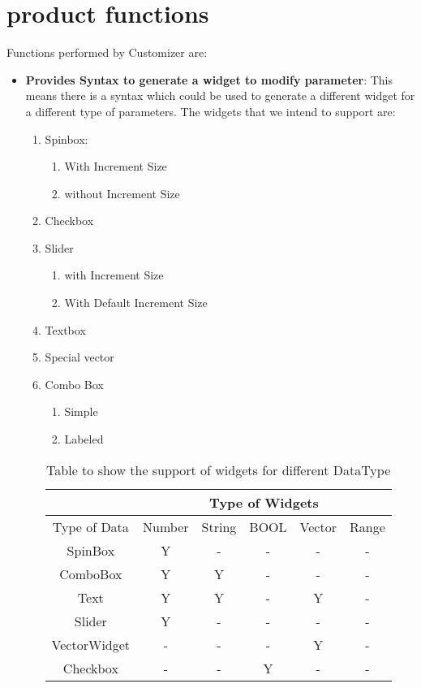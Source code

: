 \section{product functions}

Functions performed by Customizer are:
\begin{itemize}
    \item {\bf Provides Syntax to generate a widget to modify parameter}: This means there is a syntax which could be used to generate a different widget for a different type of parameters.
    The widgets that we intend to support are:
    \begin{enumerate}
        \item Spinbox:
        \begin{enumerate}
            \item With Increment Size
            \item without Increment Size
        \end{enumerate}
        \item Checkbox
        \item Slider
        \begin{enumerate}
            \item with Increment Size
            \item With Default Increment Size
        \end{enumerate}
        \item Textbox
        \item Special vector
        \item Combo Box
        \begin{enumerate}
            \item Simple
            \item Labeled
        \end{enumerate}
       
        \begin{table}[h]
            \centering
            \begin{tabular}{ |c|c|c|c|c|c| }
                \hline
                & \multicolumn{5}{|c|}{Type of Widgets} \\
                \hline
                Type of Data&    Number&    String&    BOOL &Vector &Range     \\ [0.5ex]
                \hline
                SpinBox&Y&    -&    -&    -&    - \\ \hline
                ComboBox&    Y&    Y&    -&    -&    - \\ \hline
                Text&    Y&    Y&    -&    Y&    - \\ \hline
                Slider&    Y&    -&    -&    -&    - \\ \hline
                VectorWidget&    -&    -&    -&    Y&- \\ \hline
                Checkbox&    -&    -&    Y&    -&    - \\ [1ex]
                \hline
            \end{tabular}
            \caption{Table to show the support of widgets for different DataType}
            \label{table2}
        \end{table}
       

\end{enumerate}
\end{itemize}
